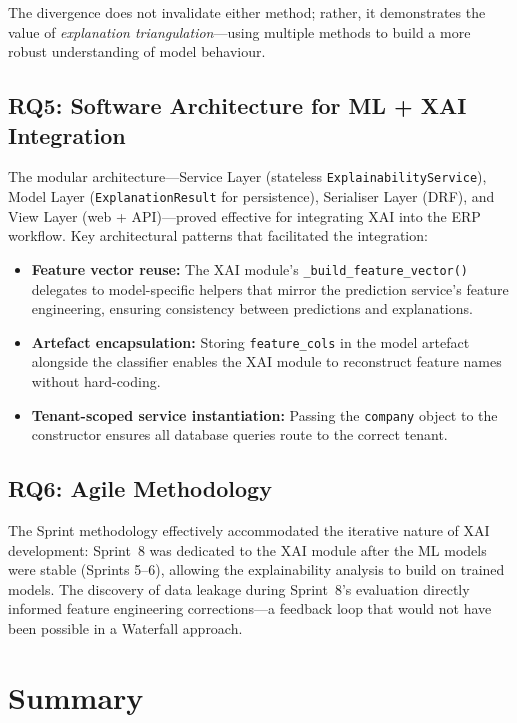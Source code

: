 \documentclass[12pt,a4paper]{report}
\begin{document}
The divergence does not invalidate either method; rather, it demonstrates the value of \textit{explanation triangulation}---using multiple methods to build a more robust understanding of model behaviour.

\subsection{RQ5: Software Architecture for ML + XAI Integration}

The modular architecture---Service Layer (stateless \texttt{ExplainabilityService}), Model Layer (\texttt{ExplanationResult} for persistence), Serialiser Layer (DRF), and View Layer (web + API)---proved effective for integrating XAI into the ERP workflow. Key architectural patterns that facilitated the integration:

\begin{itemize}
  \item \textbf{Feature vector reuse:} The XAI module's \texttt{\_build\_feature\_vector()} delegates to model-specific helpers that mirror the prediction service's feature engineering, ensuring consistency between predictions and explanations.
  \item \textbf{Artefact encapsulation:} Storing \texttt{feature\_cols} in the model artefact alongside the classifier enables the XAI module to reconstruct feature names without hard-coding.
  \item \textbf{Tenant-scoped service instantiation:} Passing the \texttt{company} object to the constructor ensures all database queries route to the correct tenant.
\end{itemize}

\subsection{RQ6: Agile Methodology}

The Sprint methodology effectively accommodated the iterative nature of XAI development: Sprint~8 was dedicated to the XAI module after the ML models were stable (Sprints 5--6), allowing the explainability analysis to build on trained models. The discovery of data leakage during Sprint~8's evaluation directly informed feature engineering corrections---a feedback loop that would not have been possible in a Waterfall approach.

\section{Summary}
\label{sec:results_summary}
\end{document}
